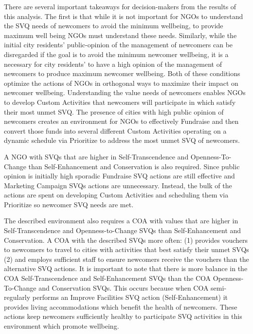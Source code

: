 \documentclass{scspaperproc}
\theoremstyle{scsthe}
\begin{document}
There are several important takeaways for decision-makers from the results of this analysis. The first is that while it is not important for NGOs to understand the SVQ needs of newcomers to avoid the minimum wellbeing, to provide maximum well being NGOs must understand these needs. Similarly, while the initial city residents' public-opinion of the management of newcomers can be disregarded if the goal is to avoid the minimum newcomer wellbeing, it is a necessary for city residents' to have a high opinion of the management of newcomers to produce maximum newcomer wellbeing. Both of these conditions optimize the actions of NGOs in orthogonal ways to maximize their impact on newcomer wellbeing. Understanding the value needs of newcomers enables NGOs to develop Custom Activities that newcomers will participate in which satisfy their most unmet SVQ. The presence of cities with high public opinion of newcomers creates an environment for NGOs to effectively Fundraise and then convert those funds into several different Custom Activities operating on a dynamic schedule via Prioritize to address the most unmet SVQ of newcomers. 

A NGO with SVQs that are higher in Self-Transcendence and Openness-To-Change than Self-Enhancement and Conservation is also required. Since public opinion is initially high sporadic Fundraise SVQ actions are still effective and Marketing Campaign SVQs actions are unnecessary. Instead, the bulk of the actions are spent on developing Custom Activities and scheduling them via Prioritize so newcomer SVQ needs are met. 

The described environment also requires a COA with values that are higher in Self-Transcendence and Openness-to-Change SVQs than Self-Enhancement and Conservation. A COA with the described SVQs more often: (1) provides vouchers to newcomers to travel to cities with activities that best satisfy their unmet SVQs (2) and employs sufficient staff to ensure newcomers receive the vouchers than the alternative SVQ actions. It is important to note that there is more balance in the COA Self-Transcendence and Self-Enhancement SVQs than the COA Openness-To-Change and Conservation SVQs. This occurs because when COA semi-regularly performs an Improve Facilities SVQ action (Self-Enhancement) it provides living accommodations which benefit the health of newcomers. These actions keep newcomers sufficiently healthy to participate SVQ activities in this environment which promote wellbeing.  
\end{document}
